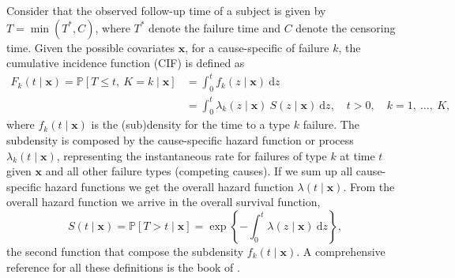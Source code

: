 \documentclass[a4paper,12pt]{article}
\begin{document}
Consider that the observed follow-up time of a subject is given by \(T =
\min(T^{\ast},C)\), where \(T^{\ast}\) denote the failure time and \(C\)
denote the censoring time. Given the possible covariates \(\bm{x}\), for
a cause-specific of failure \(k\), the cumulative incidence function
(CIF) is defined as
\begin{align*}
 F_{k}(t \mid \bm{x})
 = \mathbb{P}[T \leq t,~K = k \mid \bm{x}]
 &= \int_{0}^{t} f_{k}(z \mid \bm{x})~\text{d}z\\
 &= \int_{0}^{t} \lambda_{k}(z \mid \bm{x})~S(z \mid \bm{x})
  ~\text{d}z, \quad t > 0, \quad k = 1,~\dots,~K,
\end{align*}
where \(f_{k}(t \mid \bm{x})\) is the (sub)density for the time to a
type \(k\) failure. The subdensity is composed by the cause-specific
hazard function or process \(\lambda_{k}(t \mid \bm{x})\), representing
the instantaneous rate for failures of type \(k\) at time \(t\) given
\(\bm{x}\) and all other failure types (competing causes). If we sum up
all cause-specific hazard functions we get the overall hazard function
\(\lambda(t \mid \bm{x})\). From the overall hazard function we arrive
in the overall survival function,
\[
 S(t \mid \bm{x}) = \mathbb{P}[T > t \mid \bm{x}] =
 \exp\left\{-\int_{0}^{t} \lambda(z \mid \bm{x})~\text{d}z\right\},
\]
the second function that compose the subdensity \(f_{k}(t \mid
\bm{x})\). A comprehensive reference for all these definitions is
the book of \cite{kalb&prentice}.
\end{document}
